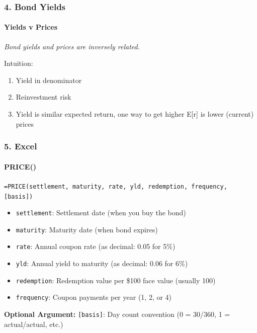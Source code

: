\documentclass{beamer}
\begin{document}
\begin{frame}[t]
    \frametitle{4. Bond Yields}
    \framesubtitle{Yields v Prices}

    \textit{Bond yields and prices are inversely related.}\\
    \vspace{1em}

    Intuition:
    \begin{enumerate}
        \item Yield in denominator
        \item Reinvestment risk
        \item Yield is similar expected return, one way to get higher E[r] is lower (current)  prices
    \end{enumerate}

\end{frame}

\begin{excelframe}[t]
    \frametitle{5. Excel}
    \framesubtitle{PRICE()}

 \texttt{=PRICE(settlement, maturity, rate, yld, redemption, frequency, [basis])}
    \vspace{1em}

    \begin{itemize}
        \item \texttt{settlement}: Settlement date (when you buy the bond)
        \item \texttt{maturity}: Maturity date (when bond expires)
        \item \texttt{rate}: Annual coupon rate (as decimal: 0.05 for 5\%)
        \item \texttt{yld}: Annual yield to maturity (as decimal: 0.06 for 6\%)
        \item \texttt{redemption}: Redemption value per \$100 face value (usually 100)
        \item \texttt{frequency}: Coupon payments per year (1, 2, or 4)
    \end{itemize}
    \vspace{1em}

    \textbf{Optional Argument:} \texttt{[basis]}: Day count convention (0 = 30/360, 1 = actual/actual, etc.)

\end{excelframe}
\end{document}
